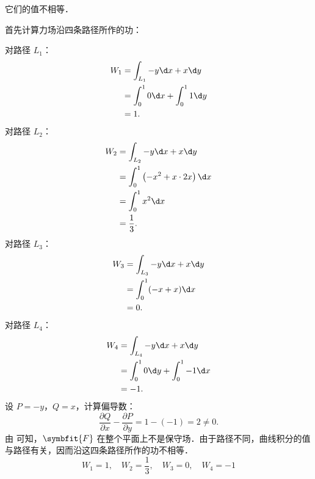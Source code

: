 \begin{solution}
     它们的值不相等．

    首先计算力场沿四条路径所作的功：

    对路径 $L_1$：
    \begin{equation}
        \begin{aligned}
            W_1 & = \int_{L_1} -y \d x + x \d y       \\
                & = \int_0^1 0 \d x + \int_0^1 1 \d y \\
                & = 1.
        \end{aligned}
    \end{equation}
    对路径 $L_2$：
    \begin{equation}
        \begin{aligned}
            W_2 & = \int_{L_2} -y \d x + x \d y                    \\
                & = \int_0^1 \left( -x^2 + x \cdot 2x \right) \d x \\
                & = \int_0^1 x^2 \d x                              \\
                & = \frac{1}{3}.
        \end{aligned}
    \end{equation}
    对路径 $L_3$：
    \begin{equation}
        \begin{aligned}
            W_3 & = \int_{L_3} -y \d x + x \d y \\
                & = \int_0^1 (-x + x) \d x      \\
                & = 0.
        \end{aligned}
    \end{equation}
    对路径 $L_4$：
    \begin{equation}
        \begin{aligned}
            W_4 & = \int_{L_4} -y \d x + x \d y        \\
                & = \int_0^1 0 \d y + \int_0^1 -1 \d x \\
                & = -1.
        \end{aligned}
    \end{equation}
    设 $P = -y$，$Q = x$，计算偏导数：
    \begin{equation}
        \label{eq:curl-1}
        \frac{\partial Q}{\partial x} - \frac{\partial P}{\partial y} = 1 - (-1) = 2 \neq 0.
    \end{equation}
    由  可知，$\symbfit{F}$ 在整个平面上不是保守场．由于路径不同，曲线积分的值与路径有关，因而沿这四条路径所作的功不相等．
    \begin{equation}
        \boxed{W_1 = 1, \quad W_2 = \frac{1}{3}, \quad W_3 = 0, \quad W_4 = -1}
    \end{equation}


\end{solution}
